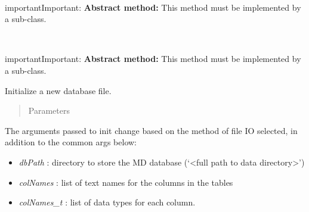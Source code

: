 \documentclass[letterpaper,10pt,english]{sphinxmanual}
\begin{document}
\begin{fulllineitems}

\begin{fulllineitems}
\label{api-doc/mosaic.meta:mosaic.metaMDIO.metaMDIO._colnames}~
\begin{notice}{important}{Important:}
\textbf{Abstract method:} This method must be implemented by a sub-class.
\end{notice}

\end{fulllineitems}


\begin{fulllineitems}
\label{api-doc/mosaic.meta:mosaic.metaMDIO.metaMDIO.closeDB}~
\begin{notice}{important}{Important:}
\textbf{Abstract method:} This method must be implemented by a sub-class.
\end{notice}

\end{fulllineitems}


\begin{fulllineitems}
\label{api-doc/mosaic.meta:mosaic.metaMDIO.metaMDIO.initDB}
Initialize a new database file.
\begin{quote}\begin{description}
\item[{Parameters}] \leavevmode
\end{description}\end{quote}

The arguments passed to init change based on the method of file IO selected, in addition to 
the common args below:
\begin{itemize}
\item {} 
\emph{dbPath} :            directory to store the MD database (`\textless{}full path to data directory\textgreater{}')

\item {} 
\emph{colNames} :  list of text names for the columns in the tables

\item {} 
\emph{colNames\_t} :        list of data types for each column.


\end{itemize}
\end{fulllineitems}
\end{fulllineitems}
\end{document}

